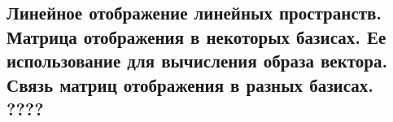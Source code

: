 {
\subsection{Линейное отображение линейных пространств. Матрица отображения в некоторых базисах. Ее использование для вычисления образа вектора.  Связь матриц отображения в разных базисах. ????}
}